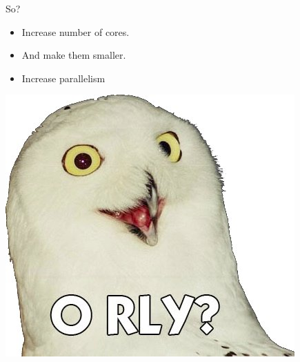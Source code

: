 \documentclass{beamer}
\begin{document}
\begin{frame}{So?}
    \begin{itemize}
        \item Increase number of cores.
        \item And make them smaller.
            \pause
        \item \alert{Increase parallelism}
    \end{itemize}
    \includegraphics[height=0.2\textheight]{images/orly.jpg}
\end{frame}
\end{document}
